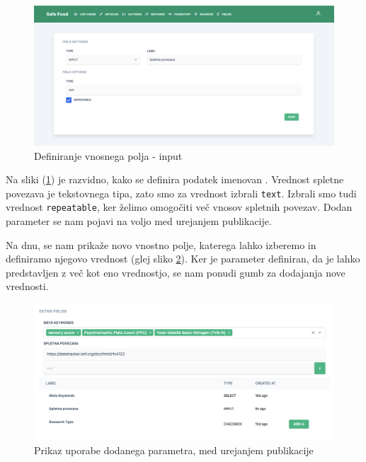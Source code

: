 \documentclass[a4paper, 12pt]{book}
\begin{document}
\begin{figure}[h]
\begin{center}
\includegraphics[width=1\textwidth]{slike/type_input.png}
\end{center}
\caption{ Definiranje vnosnega polja - input }
\label{type-input}
\end{figure}

Na sliki (\ref{type-input}) je razvidno, kako se definira podatek imenovan . Vrednost spletne povezava je tekstovnega tipa, zato smo za vrednost izbrali \verb=text=. Izbrali smo tudi vrednost \verb=repeatable=, ker želimo omogočiti več vnosov spletnih povezav. Dodan parameter se nam pojavi na voljo med urejanjem publikacije. 


Na dnu, se nam prikaže novo vnostno polje, katerega lahko izberemo in definiramo njegovo vrednost (glej sliko \ref{fields-usage}). Ker je parameter definiran, da je lahko predstavljen z več kot eno vrednostjo, se nam ponudi gumb za dodajanja nove vrednosti.

\begin{figure}[h]
\begin{center}
\includegraphics[width=1\textwidth]{slike/fields_usage.png}
\end{center}
\caption{ Prikaz uporabe dodanega parametra, med urejanjem publikacije }
\label{fields-usage}
\end{figure}
\end{document}
